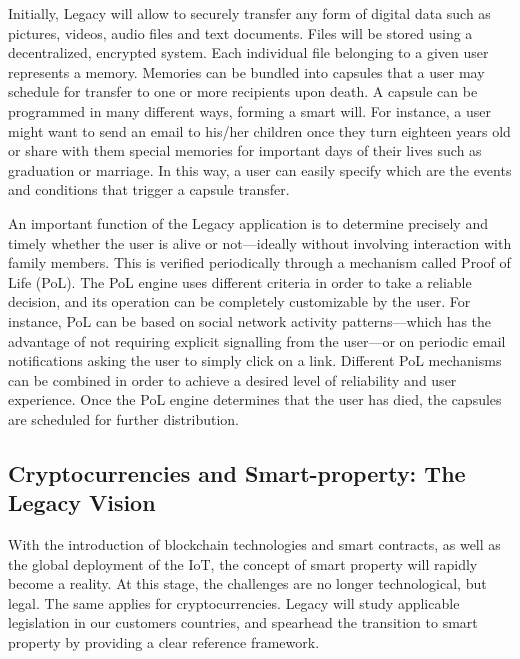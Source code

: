 Initially, Legacy will allow to securely transfer any form of digital data such as pictures, videos, audio files and text documents. Files will be stored using a decentralized, encrypted system. Each individual file belonging to a given user represents a memory. Memories can be bundled into capsules that a user may schedule for transfer to one or more recipients upon death. A capsule can be programmed in many different ways, forming a smart will. For instance, a user might want to send an email to his/her children once they turn eighteen years old or share with them special memories for important days of their lives such as graduation or marriage. In this way, a user can easily specify which are the events and conditions that trigger a capsule transfer.

An important function of the Legacy application is to determine precisely and timely whether the user is alive or not---ideally without involving interaction with family members. This is verified periodically through a mechanism called Proof of Life (PoL). The PoL engine uses different criteria in order to take a reliable decision, and its operation can be completely customizable by the user. For instance, PoL can be based on social network activity patterns---which has the advantage of not requiring explicit signalling from the user---or on periodic email notifications asking the user to simply click on a link. Different PoL mechanisms can be combined in order to achieve a desired level of reliability and user experience. Once the PoL engine determines that the user has died, the capsules are scheduled for further distribution.

\subsection{Cryptocurrencies and Smart-property: The Legacy Vision} %
\label{sub:cryptocurrencies_and_smart_property_the_legacy_vision}
With the introduction of blockchain technologies and smart contracts, as well as the global deployment of the IoT, the concept of smart property will rapidly become a reality.  At this stage, the challenges are no longer technological, but legal. The same applies for cryptocurrencies. Legacy will study applicable legislation in our customers countries, and spearhead the transition to smart property by providing a clear reference framework. 




